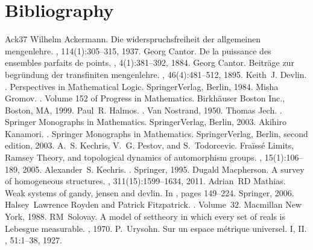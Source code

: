 \documentclass[letterpaper,10pt,english]{jupyterBook}
\begin{document}
\chapter{Bibliography}
\label{\detokenize{bibliography:bibliography}}\label{\detokenize{bibliography::doc}}
\begin{sphinxthebibliography}{Ack37}
\sphinxAtStartPar
Wilhelm Ackermann. Die widerspruchsfreiheit der allgemeinen mengenlehre. , 114(1):305–315, 1937.
\sphinxAtStartPar
Georg Cantor. De la puissance des ensembles parfaits de points. , 4(1):381–392, 1884.
\sphinxAtStartPar
Georg Cantor. Beiträge zur begründung der transfiniten mengenlehre. , 46(4):481–512, 1895.
\sphinxAtStartPar
Keith J. Devlin. . Perspectives in Mathematical Logic. Springer\sphinxhyphen{}Verlag, Berlin, 1984.
\sphinxAtStartPar
Misha Gromov. . Volume 152 of Progress in Mathematics. Birkhäuser Boston Inc., Boston, MA, 1999.
\sphinxAtStartPar
Paul R. Halmos. . Van Nostrand, 1950.
\sphinxAtStartPar
Thomas Jech. . Springer Monographs in Mathematics. Springer\sphinxhyphen{}Verlag, Berlin, 2003.
\sphinxAtStartPar
Akihiro Kanamori. . Springer Monographs in Mathematics. Springer\sphinxhyphen{}Verlag, Berlin, second edition, 2003.
\sphinxAtStartPar
A. S. Kechris, V. G. Pestov, and S. Todorcevic. Fraïssé Limits, Ramsey Theory, and topological dynamics of automorphism groups. , 15(1):106–189, 2005.
\sphinxAtStartPar
Alexander S. Kechris. . Springer, 1995.
\sphinxAtStartPar
Dugald Macpherson. A survey of homogeneous structures. , 311(15):1599–1634, 2011.
\sphinxAtStartPar
Adrian RD Mathias. Weak systems of gandy, jensen and devlin. In , pages 149–224. Springer, 2006.
\sphinxAtStartPar
Halsey Lawrence Royden and Patrick Fitzpatrick. . Volume 32. Macmillan New York, 1988.
\sphinxAtStartPar
RM Solovay. A model of set\sphinxhyphen{}theory in which every set of reals is Lebesgue measurable. , 1970.
\sphinxAtStartPar
P. Urysohn. Sur un espace métrique universel. I, II. , 51:1–38, 1927.
\end{sphinxthebibliography}
\end{document}
